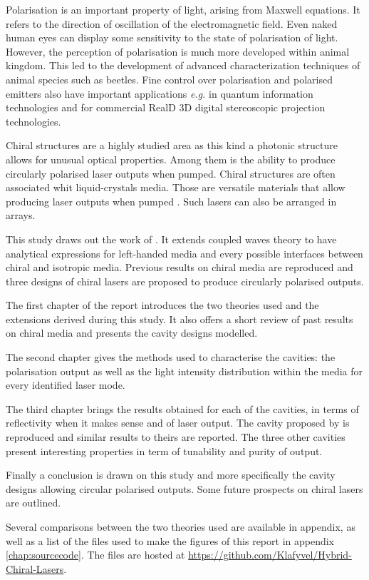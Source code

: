 
Polarisation is an important property of light, arising from Maxwell equations\cite{weir_optical_2019}. It refers to the direction of oscillation of the electromagnetic field. Even naked human eyes can display some sensitivity to the state of polarisation of light\cite{le_floch_polarization_2010}. However, the perception of polarisation is much more developed within animal kingdom. This led to the development of advanced characterization techniques of animal species such as beetles\cite{carter_variation_2016}. Fine control over polarisation and polarised emitters also have important applications \textit{e.g.} in quantum information technologies\cite{bennett_quantum_2014} and for commercial RealD 3D digital
stereoscopic projection technologies\cite{mendiburu_chapter_2009}.

Chiral structures are a highly studied area\cites{belyakova_optical_2011}{harutyunyan_optical_2007}{mccall_simplified_2009}{mccall_properties_2009} as this kind a photonic structure allows for unusual optical properties. Among them is the ability to produce circularly polarised laser outputs when pumped\cites{topf_modes_2014}{kopp_twist_2002}{oldano_comment_2004}. Chiral structures are often associated whit liquid-crystals media. Those are versatile materials that allow producing laser outputs when pumped \cites{coles_liquid-crystal_2010}{gardiner_paintable_2011}. Such lasers can also be arranged in arrays\cite{hands_two-dimensional_2008}.

This study draws out the work of \textcite{topf_modes_2014}. It extends coupled waves theory to have analytical expressions for left-handed media and every possible interfaces between chiral and isotropic media. Previous results on chiral media are reproduced and three designs of chiral lasers are proposed to produce circularly polarised outputs.

The first chapter of the report introduces the two theories used and the extensions derived during this study. It also offers a short review of past results on chiral media and presents the cavity designs modelled.

The second chapter gives the methods used to characterise the cavities: the polarisation output as well as the light intensity distribution within the media for every identified laser mode.

The third chapter brings the results obtained for each of the cavities, in terms of reflectivity when it makes sense and of laser output. The cavity proposed by \textcite{topf_modes_2014} is reproduced and similar results to theirs are reported. The three other cavities present interesting properties in term of tunability and purity of output.

Finally a conclusion is drawn on this study and more specifically the cavity designs allowing circular polarised outputs. Some future prospects on chiral lasers are outlined.

Several comparisons between the two theories used are available in appendix, as well as a list of the files used to make the figures of this report in appendix \ref{chap:sourcecode}. The files are hosted at \url{https://github.com/Klafyvel/Hybrid-Chiral-Lasers}.